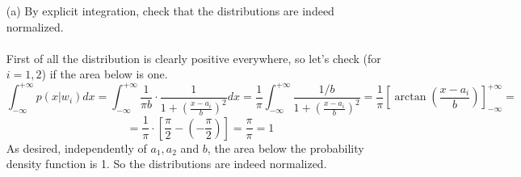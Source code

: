 \documentclass[10pt]{article}
\begin{document}
\begin{enumerate}
\Large
  \item[(a)] By explicit integration, check that the distributions are indeed normalized. \\ \ \\
\normalsize
First of all the distribution is clearly positive everywhere, so let's check (for $i=1,2$) if the area below is one.
$$
\int_{-\infty}^{+\infty} p(x|w_i) dx = \int_{-\infty}^{+\infty} \frac{1}{\pi b} \cdot \frac{1}{1 + \left(\frac{x-a_i}{b}\right)^2} dx = \frac{1}{\pi}\int_{-\infty}^{+\infty}\frac{1/b}{1 + \left(\frac{x-a_i}{b}\right)^2}=\frac{1}{\pi} \left[\arctan\left(\frac{x-a_i}{b}\right)\right]_{-\infty}^{+\infty} =
$$
$$
 =\frac{1}{\pi} \cdot \left[ \frac{\pi}{2} - \left(-\frac{\pi}{2}\right)\right] = \frac{\pi}{\pi} = 1
$$
As desired, independently of $a_1, a_2$ and $b$, the area below the probability density function is 1. So the distributions are indeed normalized. \\


\end{enumerate}
\end{document}
